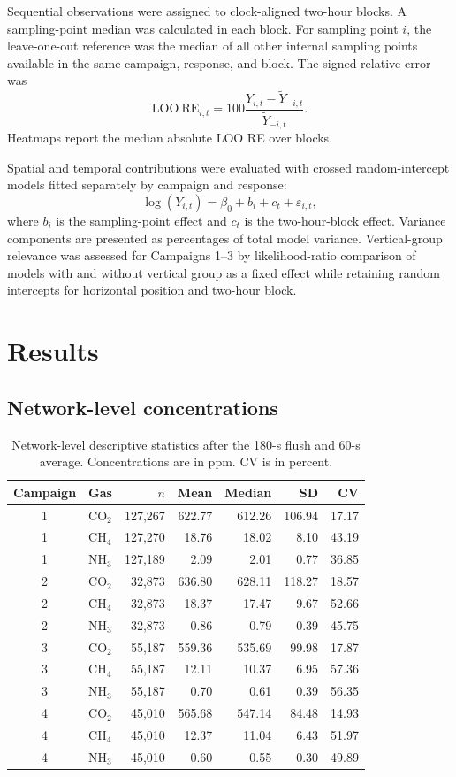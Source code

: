 \documentclass[11pt,a4paper]{article}
\begin{document}
Sequential observations were assigned to clock-aligned two-hour blocks. A sampling-point median was calculated in each block. For sampling point $i$, the leave-one-out reference was the median of all other internal sampling points available in the same campaign, response, and block. The signed relative error was
\[
\mathrm{LOO\ RE}_{i,t}=100\frac{Y_{i,t}-\widetilde{Y}_{-i,t}}{\widetilde{Y}_{-i,t}}.
\]
Heatmaps report the median absolute LOO RE over blocks.

Spatial and temporal contributions were evaluated with crossed random-intercept models fitted separately by campaign and response:
\[
\log(Y_{i,t})=\beta_0+b_i+c_t+\varepsilon_{i,t},
\]
where $b_i$ is the sampling-point effect and $c_t$ is the two-hour-block effect. Variance components are presented as percentages of total model variance. Vertical-group relevance was assessed for Campaigns 1--3 by likelihood-ratio comparison of models with and without vertical group as a fixed effect while retaining random intercepts for horizontal position and two-hour block.

\section{Results}

\subsection{Network-level concentrations}

\begin{table}[H]
\centering
\caption{Network-level descriptive statistics after the 180-s flush and 60-s average. Concentrations are in ppm. CV is in percent.}
\small
\begin{tabular}{clrrrrr}
\toprule
Campaign & Gas & $n$ & Mean & Median & SD & CV\\
\midrule
1 & CO$_2$ & 127,267 & 622.77 & 612.26 & 106.94 & 17.17\\
1 & CH$_4$ & 127,270 & 18.76 & 18.02 & 8.10 & 43.19\\
1 & NH$_3$ & 127,189 & 2.09 & 2.01 & 0.77 & 36.85\\
2 & CO$_2$ & 32,873 & 636.80 & 628.11 & 118.27 & 18.57\\
2 & CH$_4$ & 32,873 & 18.37 & 17.47 & 9.67 & 52.66\\
2 & NH$_3$ & 32,873 & 0.86 & 0.79 & 0.39 & 45.75\\
3 & CO$_2$ & 55,187 & 559.36 & 535.69 & 99.98 & 17.87\\
3 & CH$_4$ & 55,187 & 12.11 & 10.37 & 6.95 & 57.36\\
3 & NH$_3$ & 55,187 & 0.70 & 0.61 & 0.39 & 56.35\\
4 & CO$_2$ & 45,010 & 565.68 & 547.14 & 84.48 & 14.93\\
4 & CH$_4$ & 45,010 & 12.37 & 11.04 & 6.43 & 51.97\\
4 & NH$_3$ & 45,010 & 0.60 & 0.55 & 0.30 & 49.89\\
\bottomrule
\end{tabular}
\end{table}
\end{document}
